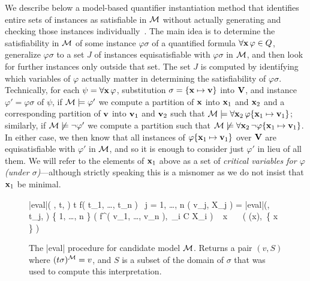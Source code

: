 \documentclass{svjour3}                     %
\begin{document}
We describe below a model-based quantifier instantiation method 
that identifies entire sets of instances as satisfiable in $\mathcal{M}$
without actually generating and checking those instances individually~\cite{ReyEtAl-2-RR-13}.
The main idea is to determine the satisfiability
in $\mathcal{M}$ of some instance $\varphi\sigma$ of a quantified formula 
$\forall \mathbf{x}\, \varphi \in Q$,
generalize $\varphi\sigma$ to a set $J$ of instances 
equisatisfiable with $\varphi\sigma$ in $\mathcal{M}$, and then 
look for further instances only outside that set.
The set $J$ is computed by identifying which variables of $\varphi$ actually
matter in determining the satisfiability of $\varphi\sigma$.
Technically, 
for each $\psi = \forall \mathbf{x}\, \varphi$,
substitution $\sigma = \{\mathbf{x} \mapsto \mathbf{v}\}$ into $\mathbf{V}$, and 
instance $\varphi' = \varphi\sigma$ of $\psi$, 
if $\mathcal{M} \models \varphi'$
we compute a partition of $\mathbf{x}$ into $\mathbf{x}_1$ and $\mathbf{x}_2$ and
a corresponding partition of $\mathbf{v}$ into $\mathbf{v}_1$ and $\mathbf{v}_2$
such that
$\mathcal{M} \models \forall \mathbf{x}_2\, \varphi\{\mathbf{x}_1 \mapsto \mathbf{v}_1\}$;
similarly, if $\mathcal{M} \not\models \lnot\varphi'$ we compute a partition 
such that
$\mathcal{M} \not\models \forall \mathbf{x}_2\, \lnot\varphi\{\mathbf{x}_1 \mapsto \mathbf{v}_1\}$.
In either case, we then know that 
all instances of $\varphi\{\mathbf{x}_1 \mapsto \mathbf{v}_1\}$ over $\mathbf{V}$
are equisatisfiable with $\varphi'$ in $\mathcal{M}$, and so 
it is enough to consider just $\varphi'$ in lieu of all them.
We will refer to the elements of $\mathbf{x}_1$ above 
as a set of \emph{critical variables for $\varphi$ (under $\sigma$)}---although
strictly speaking this is a misnomer as we do not insist that 
$\mathbf{x}_1$ be minimal.

\begin{figure}[t]
\begin{program}
\PROC |eval|( \M, t, \sigma ) \BODY 
  \MATCH t \WITH
  \mid f( t_1, \ldots, t_n ) \ \to \qtab  \quad   \LOOPFOR j = 1, \ldots, n 
       ( v_j, X_j ) = |eval|(\M, t_j, \sigma )
    \ENDLOOP
     \{ 1, \ldots, n \}
    \RETURN ( f^{\M}( v_1, \ldots, v_n ),\, \bigcup_{i \in C} X_i ) \
   \untab
  \mid x \ \to \ \ \RETURN ( \sigma(x),\, \{ x \} )
  \ENDMATCH
\ENDPROC
\end{program}
\vspace{-2ex}
\caption[The |eval| procedure]{The |eval| procedure for candidate model $\mathcal{M}$. 
Returns a pair $( v, S )$ where $( t \sigma )^{\mathcal{M}} = v$,
and $S$ is a subset of the domain of $\sigma$ that was used to compute this interpretation.
}
\label{fig:evaluate}
\end{figure}
\end{document}
